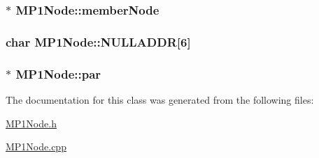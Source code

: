 \subsubsection[{member\+Node}]{$\ast$ M\+P1\+Node\+::member\+Node\hspace{0.3cm}{\ttfamily [private]}}\label{class_m_p1_node_a328d012a8827407b51ea765ee420b8a3}
\hypertarget{class_m_p1_node_a796defbef0578537c785a1c806127bb4}{}
\subsubsection[{N\+U\+L\+L\+A\+D\+D\+R}]{\setlength{\rightskip}{0pt plus 5cm}char M\+P1\+Node\+::\+N\+U\+L\+L\+A\+D\+D\+R\mbox{[}6\mbox{]}\hspace{0.3cm}{\ttfamily [private]}}\label{class_m_p1_node_a796defbef0578537c785a1c806127bb4}
\hypertarget{class_m_p1_node_ae2fee312946f5db771601f0c1b05f50d}{}
\subsubsection[{par}]{$\ast$ M\+P1\+Node\+::par\hspace{0.3cm}{\ttfamily [private]}}\label{class_m_p1_node_ae2fee312946f5db771601f0c1b05f50d}


The documentation for this class was generated from the following files\+:\begin{DoxyCompactItemize}
\item 
\hyperlink{_m_p1_node_8h}{M\+P1\+Node.\+h}\item 
\hyperlink{_m_p1_node_8cpp}{M\+P1\+Node.\+cpp}\end{DoxyCompactItemize}
